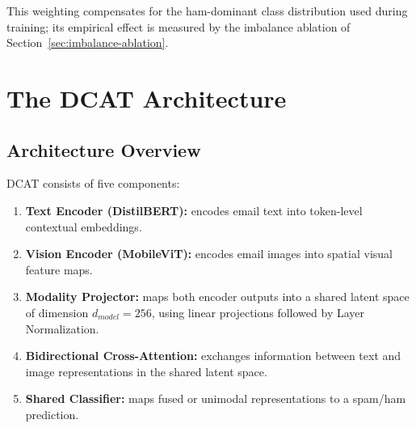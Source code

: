 \documentclass[10pt,twoside]{article}
\begin{document}
This weighting compensates for the ham-dominant class distribution used during training; its empirical effect is measured by the imbalance ablation of Section~\ref{sec:imbalance-ablation}.

\section{The DCAT Architecture}\label{sec:architecture}

\subsection{Architecture Overview}\label{sec:overview}

DCAT consists of five components:

\begin{enumerate}
\item \textbf{Text Encoder (DistilBERT):} encodes email text into token-level contextual embeddings.
\item \textbf{Vision Encoder (MobileViT):} encodes email images into spatial visual feature maps.
\item \textbf{Modality Projector:} maps both encoder outputs into a shared latent space of dimension $d_{model} = 256$, using linear projections followed by Layer Normalization.
\item \textbf{Bidirectional Cross-Attention:} exchanges information between text and image representations in the shared latent space.
\item \textbf{Shared Classifier:} maps fused or unimodal representations to a spam/ham prediction.
\end{enumerate}
\end{document}
